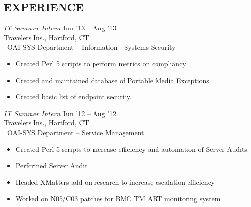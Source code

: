 \documentclass[margin]{res}
\begin{document}
\begin{resume}
\section{EXPERIENCE} {\sl IT Summer Intern} \hfill Jun '13 -- Aug '13 \\
                     Travelers Ins., Hartford, CT\\\
                     OAI-SYS Department -- Information - Systems Security
                     \begin{itemize}  \itemsep -2pt %
                         \item Created Perl 5 scripts to perform metrics on 
                         compliancy
                         \item Created and maintained database of Portable 
                         Media Exceptions
                         \item Created basic list of endpoint security.
                     \end{itemize}

                     {\sl IT Summer Intern} \hfill Jun '12 -- Aug '12 \\
                     Travelers Ins., Hartford, CT\\\
                     OAI-SYS Department -- Service Management
                     \begin{itemize}  \itemsep -2pt %
                         \item Created Perl 5 scripts to increase efficiency and
                               automation of Server Audits
                         \item Performed Server Audit
                         \item Headed XMatters add-on research to increase escalation
                               efficiency
                         \item Worked on N05/C03 patches for BMC TM ART monitoring
                               system
                     \end{itemize}
      

\end{resume}
\end{document}

